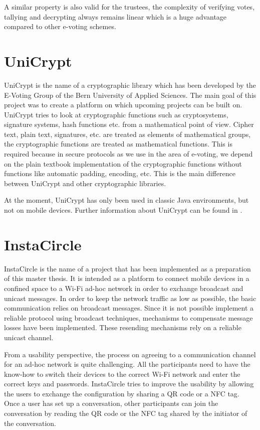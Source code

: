 \documentclass[numbers=noenddot, abstract=on, a4paper, headsepline,
footsepline, oneside, draft=off]{scrreprt}
\begin{document}
A similar property is also valid for the trustees, the complexity of verifying
votes, tallying and decrypting always remains linear which is a huge advantage
compared to other e-voting schemes.


\section{UniCrypt}
\label{sec:unicrypt}
UniCrypt is the name of a cryptographic library which has been developed by the
E-Voting Group of the Bern University of Applied Sciences. The main goal of this
project was to create a platform on which upcoming projects can be built on.
UniCrypt tries to look at cryptographic functions such as cryptosystems,
signature systems, hash functions etc. from a mathematical point of view. Cipher
text, plain text, signatures, etc. are treated as elements of mathematical
groups, the cryptographic functions are treated as mathematical functions. This
is required because in secure protocols as we use in the area of e-voting, we
depend on the plain textbook implementation of the cryptographic functions
without functions like automatic padding, encoding, etc. This is the main
difference between UniCrypt and other cryptographic libraries.

At the moment, UniCrypt has only been used in classic Java environments, but not
on mobile devices. Further information about UniCrypt can be found in
\cite{ritter12}.

\section{InstaCircle}
\label{sec:instacircle}
InstaCircle is the name of a project that has been implemented as a preparation
of this master thesis. It is intended as a platform to connect mobile devices
in a confined space to a Wi-Fi ad-hoc network in order to exchange broadcast
and unicast messages. In order to keep the network traffic as low as possible,
the basic communication relies on broadcast messages. Since it is not possible
implement a reliable protocol using broadcast techniques, mechanisms to
compensate message losses have been implemented. These resending mechanisms rely
on a reliable unicast channel.

From a usability perspective, the process on agreeing to a communication channel
for an ad-hoc network is quite challenging. All the participants need to have
the know-how to switch their devices to the correct Wi-Fi network and enter the
correct keys and passwords. InstaCircle tries to improve the usability by
allowing the users to exchange the configuration by sharing a QR code or a NFC
tag. Once a user has set up a conversation, other participants can join the
conversation by reading the QR code or the NFC tag shared by the initiator of
the conversation.
\end{document}
